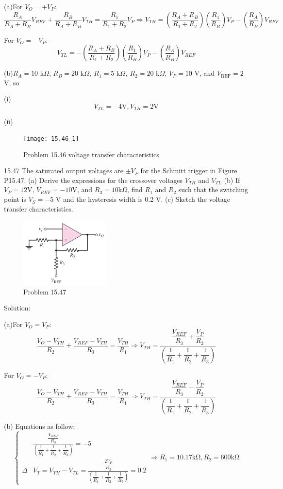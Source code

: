 \documentclass[a4paper,11pt,UTF8]{article}
\begin{document}
(a)For $V_O=+V_P$:
$$
\frac{R_A}{R_A+R_B}V_{REF}+\frac{R_B}{R_A+R_B}V_{TH}=\frac{R_1}{R_1+R_2}V_P\Rightarrow V_{TH}=\left(\frac{R_A+R_B}{R_1+R_2}\right)\left(\frac{R_1}{R_B}\right)V_P-\left(\frac{R_A}{R_B}\right)V_{REF}
$$

For $V_O=-V_P$:
$$
 V_{TL}=-\left(\frac{R_A+R_B}{R_1+R_2}\right)\left(\frac{R_1}{R_B}\right)V_P-\left(\frac{R_A}{R_B}\right)V_{REF}
$$

(b)$R_A=10$ k$\Omega$, $R_B=20$ k$\Omega,\:R_1=5$ k$\Omega,\:R_2=20$ k$\Omega$, $V_P=10$ V, and $V_{\mathrm{REF}}=2$ V, so 

(i)
$$
	V_{TL}=-4\mathrm{V},V_{TH}=2\mathrm{V}
$$

(ii)
\begin{figure}[H]
	\centering
	\texttt{[image: 15.46\_1]}
	\caption{Problem 15.46 voltage transfer characteristics}
\end{figure}

15.47 The saturated output voltages are $\pm V_P$ for the Schmitt trigger in Figure P15.47. (a) Derive the expressions for the crossover voltages $V_{TH}$ and  $V_{TL}$ (b) If $V_P= 12$V, $V_{REF}= - 10$V, and $R_3= 10$k$\Omega$, find $R_1$ and $R_2$ such that the switching point is $V_S=-5$ V and the hysteresis width is 0.2 V. (c) Sketch the voltage transfer characteristics.
\begin{figure}[H]
	\centering
	\includegraphics[width=0.4\textwidth]{15.47}
	\caption{Problem 15.47}
\end{figure}
\noindent Solution:

(a)For $V_O=V_P$:
$$
	\frac{V_O-V_{TH}}{R_2}+\frac{V_{REF}-V_{TH}}{R_3}=\frac{V_{TH}}{R_1}\Rightarrow V_{TH} =\frac{\dfrac{V_{REF}}{R_3}+\dfrac{V_P}{R_2}}{\left(\dfrac1{R_1}+\dfrac1{R_2}+\dfrac1{R_3}\right)}
$$

For $V_O=-V_P$:
$$
\frac{V_O-V_{TH}}{R_2}+\frac{V_{REF}-V_{TH}}{R_3}=\frac{V_{TH}}{R_1}\Rightarrow V_{TH} =\frac{\dfrac{V_{REF}}{R_3}-\dfrac{V_P}{R_2}}{\left(\dfrac1{R_1}+\dfrac1{R_2}+\dfrac1{R_3}\right)}
$$

(b) Equations as follow:
$$
	\left\{\begin{aligned}
		&\frac{\dfrac{V_{REF}}{R_3}}{\left(\dfrac1{R_1}+\dfrac1{R_2}+\dfrac1{R_3}\right)}=-5\\
		\Delta &V_T=V_{TH}-V_{TL}=\frac{\dfrac{2V_P}{R_2}}{\left(\dfrac1{R_1}+\dfrac1{R_2}+\dfrac1{R_3}\right)}=0.2
	\end{aligned}\right.\Rightarrow R_1=10.17\mathrm{k\Omega},R_2=600\mathrm{k\Omega}
$$
\end{document}
